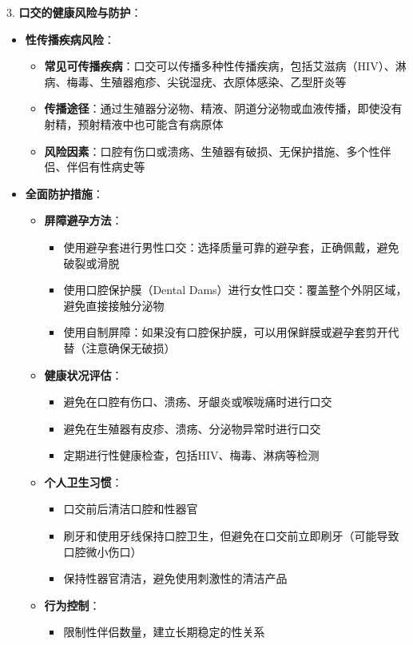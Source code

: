 \documentclass[12pt,UTF8]{ctexbook}
\begin{document}
3. \textbf{口交的健康风险与防护}：
  \begin{itemize}
  \item \textbf{性传播疾病风险}：
    \begin{itemize}
    \item \textbf{常见可传播疾病}：口交可以传播多种性传播疾病，包括艾滋病（HIV）、淋病、梅毒、生殖器疱疹、尖锐湿疣、衣原体感染、乙型肝炎等
    \item \textbf{传播途径}：通过生殖器分泌物、精液、阴道分泌物或血液传播，即使没有射精，预射精液中也可能含有病原体
    \item \textbf{风险因素}：口腔有伤口或溃疡、生殖器有破损、无保护措施、多个性伴侣、伴侣有性病史等
    \end{itemize}
  \item \textbf{全面防护措施}：
    \begin{itemize}
    \item \textbf{屏障避孕方法}：
      \begin{itemize}
      \item 使用避孕套进行男性口交：选择质量可靠的避孕套，正确佩戴，避免破裂或滑脱
      \item 使用口腔保护膜（Dental Dams）进行女性口交：覆盖整个外阴区域，避免直接接触分泌物
      \item 使用自制屏障：如果没有口腔保护膜，可以用保鲜膜或避孕套剪开代替（注意确保无破损）
      \end{itemize}
    \item \textbf{健康状况评估}：
      \begin{itemize}
      \item 避免在口腔有伤口、溃疡、牙龈炎或喉咙痛时进行口交
      \item 避免在生殖器有皮疹、溃疡、分泌物异常时进行口交
      \item 定期进行性健康检查，包括HIV、梅毒、淋病等检测
      \end{itemize}
    \item \textbf{个人卫生习惯}：
      \begin{itemize}
      \item 口交前后清洁口腔和性器官
      \item 刷牙和使用牙线保持口腔卫生，但避免在口交前立即刷牙（可能导致口腔微小伤口）
      \item 保持性器官清洁，避免使用刺激性的清洁产品
      \end{itemize}
    \item \textbf{行为控制}：
      \begin{itemize}
      \item 限制性伴侣数量，建立长期稳定的性关系

\end{itemize}
\end{itemize}
\end{itemize}
\end{document}
